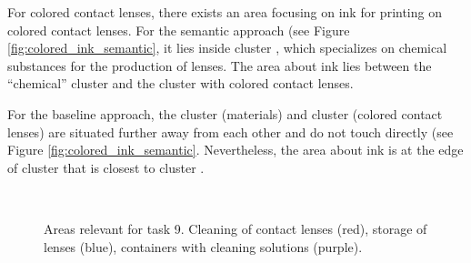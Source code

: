 For colored contact lenses, there exists an area focusing on ink for printing on colored contact lenses.
For the semantic approach (see Figure \autoref{fig:colored_ink_semantic}, it lies inside cluster , which specializes on chemical substances for the production of lenses.
The area about ink lies between the ``chemical'' cluster  and the cluster  with colored contact lenses.

For the baseline approach, the cluster  (materials)  and cluster  (colored contact lenses) are situated further away from each other and do not touch directly (see Figure \autoref{fig:colored_ink_semantic}.
Nevertheless, the area about ink is at the edge of cluster  that is closest to cluster  .

\begin{figure}[!]
    \centering
    \\
    \caption{Areas relevant for task 9. Cleaning of contact lenses (red), storage of lenses (blue), containers with cleaning solutions (purple).}
    \label{fig:cleaning_package}
\end{figure}

